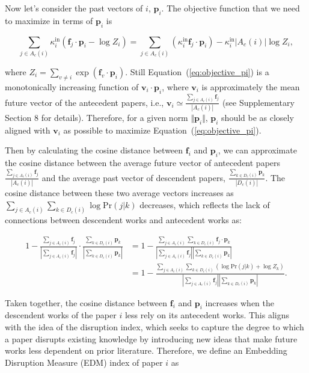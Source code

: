 \documentclass[12pt]{article}
\begin{document}
\begin{refsection}
Now let's consider the past vectors of $i$, $\mathbf{p}_i.$ The objective function that we need to maximize in terms of $\mathbf{p}_i$ is 

\begin{equation}
    \sum_{j \in A_c(i)} \kappa_i^{\text{in}} \left( {\mathbf{f}_j \cdot \mathbf{p}_i} - \log {Z_i} \right)  =    \sum_{j \in A_c(i)} \left(\kappa_i^{\text{in}}  \mathbf{f}_j \cdot \mathbf{p}_i \right) - \kappa_i^{\text{in}}  
 |A_c(i)|\log {Z_i}   , \label{eq:objective_pi}
\end{equation}

where \( Z_i = \sum_{v \neq i} \exp(\mathbf{f}_v \cdot \mathbf{p}_i) \). Still Equation~(\ref{eq:objective_pi}) is a monotonically increasing function of \(\mathbf{v}_i \cdot \mathbf{p}_i\), where \(\mathbf{v}_i\) is approximately the mean future vector of the antecedent papers, i.e., 
$\mathbf{v}_i \simeq \frac{\sum_{j \in A_c(i)} \mathbf{f}_j}{|A_c(i)|}$
(see Supplementary Section 8 for details). Therefore, for a given norm \(\Vert \mathbf{p}_i \Vert\), \(\mathbf{p}_i\) should be as closely aligned with \(\mathbf{v}_i\) as possible to maximize Equation~(\ref{eq:objective_pi}).

Then by calculating the cosine distance between $\mathbf{f}_i$ and $\mathbf{p}_i$, we can approximate the cosine distance between the average future vector of antecedent papers $\frac{\sum_{j \in A_c(i)}\mathbf{f}_j}{|A_c(i)|}$ and the average past vector of descendent papers, $\frac{\sum_{k \in D_c(i)}  \mathbf{p}_k}{|D_c(i)|}$.  The cosine distance between these two average vectors increases as $ \sum_{j \in A_c(i)}\sum_{k \in D_c(i)} \log \text{Pr}(j|k)$ decreases, which reflects the lack of connections between descendent works and antecedent works as:

\begin{align*}
1- \frac{\sum_{j\in A_c(i)}\mathbf{f}_j}{|\sum_{j\in A_c(i)}\mathbf{f}_j|} \cdot \frac{\sum_{k \in D_c(i)} \mathbf{p}_k  }{|\sum_{k \in D_c(i)} \mathbf{p}_k|}  &  = 1- \frac{\sum_{j \in A_c(i)}\sum_{k \in D_c(i)} \mathbf{f}_j \cdot\mathbf{p}_k}{|\sum_{j \in A_c(i)} \mathbf{f}_j||\sum_{k \in D_c(i)} \mathbf{p}_k|  }\\
 &=   1 -\frac{\sum_{j \in A_c(i)}\sum_{k \in D_c(i)}  \left(\log \text{Pr}(j|k) + \log Z_{k} \right)}{|\sum_{j\in A_c(i)}\mathbf{f}_j||\sum_{k\in D_c(i)} \mathbf{p}_k|  }.
\end{align*}



Taken together, the cosine distance between $\mathbf{f}_i$ and $\mathbf{p}_i$ increases when the descendent works of the paper $i$ less rely on its antecedent works. This aligns with the idea of the disruption index, which seeks to capture the degree to which a paper disrupts existing knowledge by introducing new ideas that make future works less dependent on prior literature. Therefore, we define an Embedding Disruption Measure (EDM) index of paper $i$ as 


\end{refsection}
\end{document}
